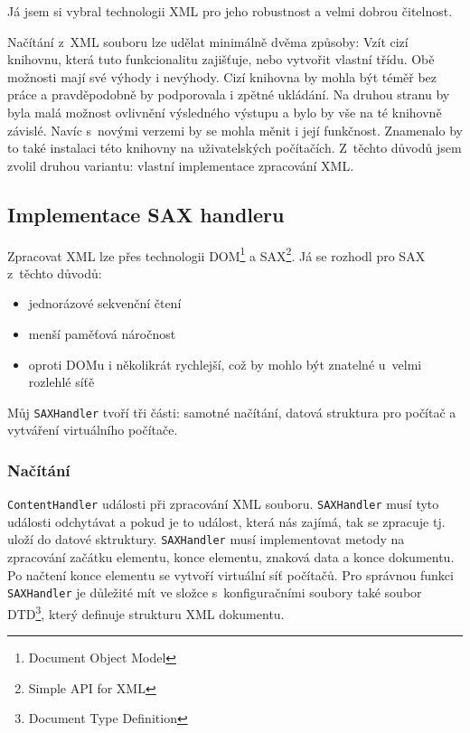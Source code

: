 Já jsem si vybral technologii XML pro jeho robustnost a velmi dobrou čitelnost.

Načítání z~XML souboru lze udělat minimálně dvěma způsoby: Vzít cizí knihovnu, která tuto funkcionalitu zajišťuje, nebo vytvořit vlastní třídu. Obě možnosti mají své výhody i nevýhody. Cizí knihovna by mohla být téměř bez práce a pravděpodobně by podporovala i zpětné ukládání. Na druhou stranu by byla malá možnost ovlivnění výsledného výstupu a bylo by vše na té knihovně závislé. Navíc s~novými verzemi by se mohla měnit i její funkčnost. Znamenalo by to také instalaci této knihovny na uživatelských počítačích. Z~těchto důvodů jsem zvolil druhou variantu: vlastní implementace zpracování XML. 


\subsection{Implementace SAX handleru}
Zpracovat XML lze přes technologii DOM\footnote{Document Object Model} a SAX\footnote{Simple API for XML}. Já se rozhodl pro SAX z~těchto důvodů:
\begin{itemize}
 \item jednorázové sekvenční čtení
 \item menší paměťová náročnost
 \item oproti DOMu i několikrát rychlejší, což by mohlo být znatelné u~velmi rozlehlé síťě
\end{itemize}

Můj \verb|SAXHandler| tvoří tři části: samotné načítání, datová struktura pro počítač a vytváření virtuálního počítače.

\subsubsection{Načítání}
\verb|ContentHandler|  události při zpracování XML souboru. \verb|SAXHandler| musí tyto události odchytávat a pokud je to událost, která nás zajímá, tak se zpracuje tj. uloží do datové sktruktury. \verb|SAXHandler| musí implementovat metody na zpracování začátku elementu, konce elementu, znaková data a konce dokumentu. Po načtení konce elementu se vytvoří virtuální síť počítačů. Pro správnou funkci \verb|SAXHandler| je důležité mít ve složce s~konfiguračními soubory také soubor DTD\footnote{Document Type Definition}, který definuje strukturu XML dokumentu.


